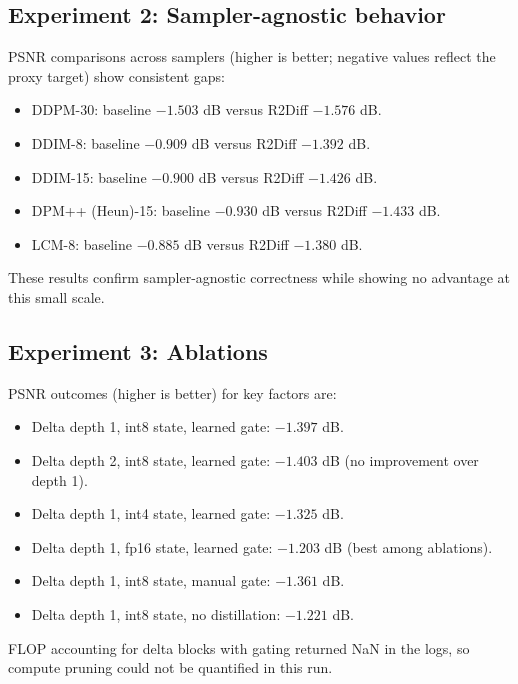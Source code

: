 \documentclass{article}
\begin{document}
\subsection{Experiment 2: Sampler-agnostic behavior}
PSNR comparisons across samplers (higher is better; negative values reflect the proxy target) show consistent gaps:
\begin{itemize}
  \item DDPM-30: baseline $-1.503$ dB versus R2Diff $-1.576$ dB.
  \item DDIM-8: baseline $-0.909$ dB versus R2Diff $-1.392$ dB.
  \item DDIM-15: baseline $-0.900$ dB versus R2Diff $-1.426$ dB.
  \item DPM++ (Heun)-15: baseline $-0.930$ dB versus R2Diff $-1.433$ dB.
  \item LCM-8: baseline $-0.885$ dB versus R2Diff $-1.380$ dB.
\end{itemize}
These results confirm sampler-agnostic correctness while showing no advantage at this small scale.

\subsection{Experiment 3: Ablations}
PSNR outcomes (higher is better) for key factors are:
\begin{itemize}
  \item Delta depth 1, int8 state, learned gate: $-1.397$ dB.
  \item Delta depth 2, int8 state, learned gate: $-1.403$ dB (no improvement over depth 1).
  \item Delta depth 1, int4 state, learned gate: $-1.325$ dB.
  \item Delta depth 1, fp16 state, learned gate: $-1.203$ dB (best among ablations).
  \item Delta depth 1, int8 state, manual gate: $-1.361$ dB.
  \item Delta depth 1, int8 state, no distillation: $-1.221$ dB.
\end{itemize}
FLOP accounting for delta blocks with gating returned NaN in the logs, so compute pruning could not be quantified in this run.
\end{document}

